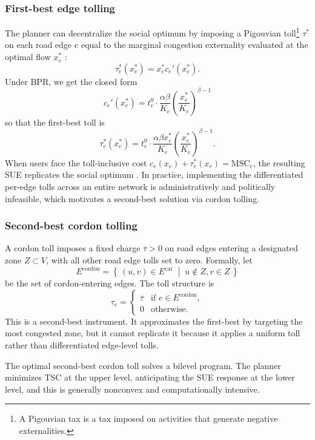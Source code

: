 \documentclass[12pt]{article}
\newcommand{\Ecar}{E^\text{car}}
\newcommand{\Ecordon}{E^\text{cordon}}
\newcommand{\set}[2]{\left\{\,#1 \;\middle|\; #2\,\right\}}
\begin{document}
\subsubsection{First-best edge tolling}

The planner can decentralize the social optimum by imposing a Pigouvian toll\footnote{A Pigouvian tax is a tax imposed on activities that generate negative externalities.} $\tau^\ast$ on each road edge $e$ equal to the marginal congestion externality evaluated at the optimal flow $x_e^\ast$ \citep{vickrey1969congestion}:
\[
    \tau_e^\ast(x_e^\ast) = x_e^\ast c_e'(x_e^\ast).
\]
Under BPR, we get the closed form
\[
    c_e'(x_e^\ast) = t_e^0 \cdot \frac{\alpha \beta}{K_e} \left(\frac{x_e^\ast}{K_e}\right)^{\beta - 1}
\]
so that the first-best toll is
\[
    \tau_e^\ast(x_e^\ast) = t_e^0 \cdot \frac{\alpha \beta x_e^\ast}{K_e} \left(\frac{x_e^\ast}{K_e}\right)^{\beta - 1}.
\]
When users face the toll-inclusive cost $c_e(x_e) + \tau_e^\ast(x_e) = \mathrm{MSC}_e$, the resulting SUE replicates the social optimum \citep{pigou1920welfare,knight1924socialcost,vickrey1969congestion}.
In practice, implementing the differentiated per-edge tolls across an entire network is administratively and politically infeasible, which motivates a second-best solution via cordon tolling.

\subsubsection{Second-best cordon tolling}

A cordon toll imposes a fixed charge $\overline{\tau} > 0$ on road edges entering a designated zone $Z \subset V$, with all other road edge tolls set to zero.
Formally, let
\[
    \Ecordon = \set{(u, v) \in \Ecar}{u \notin Z, v \in Z}
\]
be the set of cordon-entering edges.
The toll structure is
\[
    \tau_e =
    \begin{cases}
        \overline{\tau} &\text{if } e \in \Ecordon, \\
        0 &\text{otherwise.}
    \end{cases}
\]
This is a second-best instrument.
It approximates the first-best by targeting the most congested zone, but it cannot replicate it because it applies a uniform toll rather than differentiated edge-level tolls.

The optimal second-best cordon toll solves a bilevel program.
The planner minimizes TSC at the upper level, anticipating the SUE response at the lower level, and this is generally nonconvex and computationally intensive.
\end{document}
